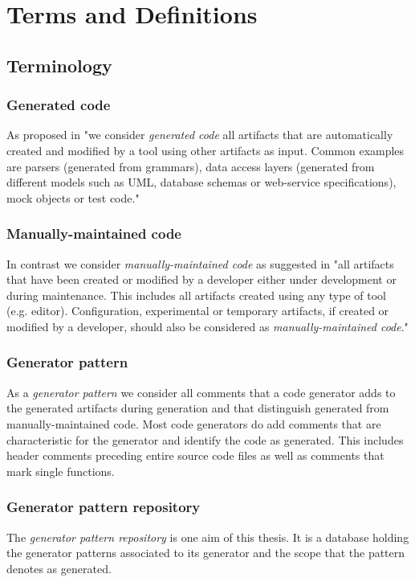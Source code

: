 
\chapter{Terms and Definitions}\label{chapter:terms}

\section{Terminology}
\subsection{Generated code}
As proposed in \cite{Alves2011} "we consider \textit{generated code} all artifacts that are automatically created and modified by a tool using other artifacts as input. Common examples are parsers (generated from grammars), data access layers (generated from different models such as UML, database schemas or web-service specifications), mock objects or test code."\cite{Alves2011}

\subsection{Manually-maintained code}
In contrast we consider \textit{manually-maintained code} as suggested in \cite{Alves2011} "all artifacts that have been created or modified by a developer either under development or during maintenance. This includes all artifacts created using any type of tool (e.g. editor). Configuration, experimental or temporary artifacts, if created or modified by a developer, should also be considered as \textit{manually-maintained code}."\cite{Alves2011}

\subsection{Generator pattern}
As a \textit{generator pattern} we consider all comments that a code generator adds to the generated artifacts during generation and that distinguish generated from manually-maintained code. Most code generators do add comments that are characteristic for the generator and identify the code as generated. This includes header comments preceding entire source code files as well as comments that mark single functions.

\subsection{Generator pattern repository}
The \textit{generator pattern repository} is one aim of this thesis. It is a database holding the generator patterns associated to its generator and the scope that the pattern denotes as generated.

